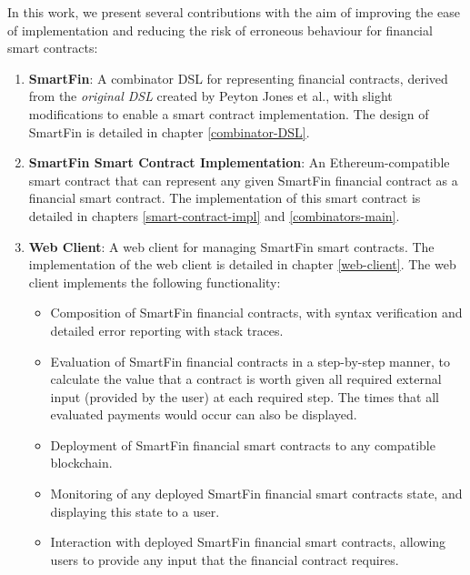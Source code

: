 In this work, we present several contributions with the aim of improving the ease of implementation and reducing the risk of erroneous behaviour for financial smart contracts: \\

\begin{enumerate}
    \item \textbf{SmartFin}: A combinator DSL for representing financial contracts, derived from the \textit{original DSL} created by Peyton Jones et al.\cite{SPJ}, with slight modifications to enable a smart contract implementation. The design of SmartFin is detailed in chapter \ref{combinator-DSL}.
    \item \textbf{SmartFin Smart Contract Implementation}: An Ethereum-compatible smart contract that can represent any given SmartFin financial contract as a financial smart contract. The implementation of this smart contract is detailed in chapters \ref{smart-contract-impl} and \ref{combinators-main}.
    \item \textbf{Web Client}: A web client for managing SmartFin smart contracts. The implementation of the web client is detailed in chapter \ref{web-client}. The web client implements the following functionality:
    \begin{itemize}
        \item Composition of SmartFin financial contracts, with syntax verification and detailed error reporting with stack traces.
        \item Evaluation of SmartFin financial contracts in a step-by-step manner, to calculate the value that a contract is worth given all required external input (provided by the user) at each required step. The times that all evaluated payments would occur can also be displayed.
        \item Deployment of SmartFin financial smart contracts to any compatible blockchain.
        \item Monitoring of any deployed SmartFin financial smart contracts state, and displaying this state to a user.
        \item Interaction with deployed SmartFin financial smart contracts, allowing users to provide any input that the financial contract requires. \\
    \end{itemize}
\end{enumerate}

